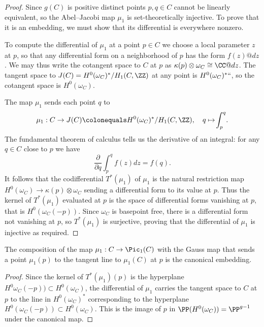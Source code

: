 \begin{proof}
Since $g(C)$
is positive
distinct points $p, q \in C$ cannot be linearly equivalent, so the
Abel--Jacobi map $\mu_1$ is set-theoretically
injective. To prove that it is an embedding, we must show
that its differential is
everywhere nonzero.

To compute the differential of $\mu_1$ at a point $p\in C$ we choose a
local parameter $z$ at $p$, so that any differential form on a
neighborhood of $p$ has the form $f(z)@dz$. We may thus write the
cotangent space to $C$ at $p$ as
$\kappa(p) \otimes \omega_{C} \cong \CC@dz$. The tangent space to
$J(C) = H^0(\omega_C)^*/H_1(C, \ZZ)$ at any point is
$H^0(\omega_C)^*` `$, so the 
%
cotangent space
is $H^0(\omega_C)$.

The map $\mu_{1}$ sends each point $q$ to
\vspace*{-2pt}
$$
\mu_1 : C \to J(C) \colonequals H^0(\omega_C)^*/H_1(C, \ZZ),  
\quad q \mapsto \!\int_p^q \!.
\vspace*{-2pt}
$$
The 
%
fundamental theorem of calculus
tells us the derivative of an integral: 
for any $q\in C$ close to $p$ we have
$$
\frac{\partial}{\partial q} \int_p^q \!f(z)dz = f(q).
$$
It follows that
the 
%
codifferential 
$T^*(\mu_1)$ of $\mu_1$ is the natural restriction map $H^0(\omega_{C}) \to \kappa(p) \otimes \omega_{C}$ sending
a differential form to its value at $p$. Thus the kernel of $T^*(\mu_1)$ evaluated at $p$ is the space of differential forms vanishing
at $p$, that is
$H^{0}(\omega_{C}(-p))$. Since $\omega_{C}$ is basepoint free, there is a differential form not vanishing at $p$,
so  $T^*(\mu_1)$ is surjective, proving that
the differential of $\mu_{1}$ is injective as required.
\end{proof}

\begin{corollary}
The composition of the map $\mu_{1}: C \to \Pic_{1}(C)$ with the 
Gauss map 
%
that sends a point $\mu_{1}(p)$
to the tangent line to $\mu_{1}(C)$ at $p$ is the 
canonical embedding.
%
\unif
\end{corollary}

\begin{proof}
Since 
the kernel of $T^*(\mu_1)(p)$ is  the hyperplane $H^{0}\omega_{C}(-p))\subset H^{0}(\omega_{C})$, the differential 
of $\mu_{1}$ carries the tangent space to $C$ at $p$ to the line
in $H^0(\omega_C)^*$ corresponding to the hyperplane $H^0(\omega_C(-p))\subset H^0(\omega_C)$.
This is the image of $p$ in $\PP(H^{0}(\omega_{C})) = \PP^{g-1}$ under the
canonical map.
\end{proof}


